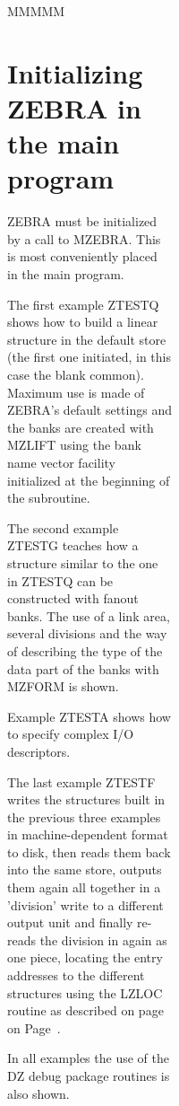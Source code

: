 \begin{figure}
\begin{figure}
\begin{figure}
\begin{figure}
\begin{DL}{MMMMM}
\section{Initializing ZEBRA in the main program}
\par ZEBRA must be initialized by a call to MZEBRA.
This is most conveniently placed in the main program.
\par
The first example ZTESTQ shows how to build a linear structure in the default
store (the first one initiated, in this case the blank common). Maximum use is
made of ZEBRA's default settings and the banks are created with MZLIFT using
the bank name vector facility initialized at the beginning of the subroutine.
\par
The second example ZTESTG teaches how a structure similar to the one in ZTESTQ
can be constructed with fanout banks. The use of a link area, several
divisions and the way of describing the type of the data part of the banks
with MZFORM is shown.
\par Example ZTESTA shows how to specify complex I/O descriptors.
\par The last example ZTESTF writes the structures built in the previous three
examples in machine-dependent format to disk, then reads them back into
the same store, outputs them again all together in a 'division' write
to a different output unit and finally re-reads the division in again
as one piece, locating the entry addresses to the different structures
using the LZLOC routine as described on page
on Page~\pageref{LZLOC FORM=PAGEONLY}.
\par
In all examples the use of the DZ debug package routines is also shown.
\begin{figure}\label{ZEBEXA0 FRAME=BOX PLACE=INLINE>
\caption{The main program for running the ZEBRA examples}
\begin{verbatim}
      PROGRAM ZEXAM
 
      CALL MZEBRA(0)
 
C--     Build linear structures in the default store
 
      CALL ZTESTQ
 
C--     Build fanout structures in a secondary store
 
      CALL ZTESTG
 
C--     Describe a few complicated I/O characteristics with MZFORM
 
      CALL ZTESTA
 
C--     Use the structures built up to now, and write and read them
 

\end{verbatim}}
\end{figure}
\end{DL}
\end{figure}
\end{figure}
\end{figure}
\end{figure}
